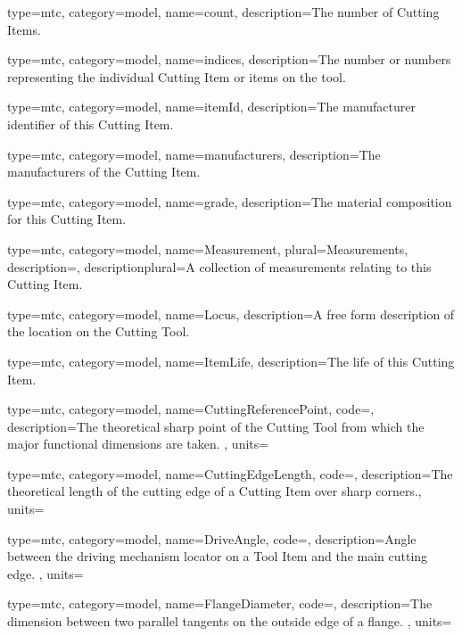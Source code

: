 {
  type=mtc,
  category=model,
  name={count},
  description={The number of Cutting Items. }
}


{
  type=mtc,
  category=model,
  name={indices},
  description={The number or numbers representing the individual Cutting Item or items on the tool. }
}


{
  type=mtc,
  category=model,
  name={itemId},
  description={The manufacturer identifier of this Cutting Item. }
}


{
  type=mtc,
  category=model,
  name={manufacturers},
  description={The manufacturers of the Cutting Item. }
}


{
  type=mtc,
  category=model,
  name={grade},
  description={The material composition for this Cutting Item.}
}


{
  type=mtc,
  category=model,
  name={Measurement},
  plural={Measurements},
  description={},
  descriptionplural={A collection of measurements relating to this Cutting Item.}
}


{
  type=mtc,
  category=model,
  name={Locus},
  description={A free form description of the location on the Cutting Tool.}
}


{
  type=mtc,
  category=model,
  name={ItemLife},
  description={The life of this Cutting Item.}
}


{
  type=mtc,
  category=model,
  name={CuttingReferencePoint},
  code=,
  description={The theoretical sharp point of the Cutting Tool from which the major functional dimensions are taken. },
  units=
}


{
  type=mtc,
  category=model,
  name={CuttingEdgeLength},
  code=,
  description={The theoretical length of the cutting edge of a Cutting Item over sharp corners.},
  units=
}


{
  type=mtc,
  category=model,
  name={DriveAngle},
  code=,
  description={Angle between the driving mechanism locator on a Tool Item and the main cutting edge. },
  units=
}


{
  type=mtc,
  category=model,
  name={FlangeDiameter},
  code=,
  description={The dimension between two parallel tangents on the outside edge of a flange. },
  units=
}


